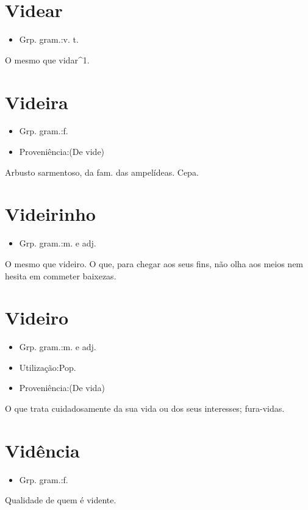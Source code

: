 \documentclass{article}
\begin{document}
\section{Videar}
\begin{itemize}
\item {Grp. gram.:v. t.}
\end{itemize}
O mesmo que \textunderscore vidar\textunderscore ^1.
\section{Videira}
\begin{itemize}
\item {Grp. gram.:f.}
\end{itemize}
\begin{itemize}
\item {Proveniência:(De \textunderscore vide\textunderscore )}
\end{itemize}
Arbusto sarmentoso, da fam. das ampelídeas.
Cepa.
\section{Videirinho}
\begin{itemize}
\item {Grp. gram.:m.  e  adj.}
\end{itemize}
O mesmo que \textunderscore videiro\textunderscore .
O que, para chegar aos seus fins, não olha aos meios nem hesita em commeter baixezas.
\section{Videiro}
\begin{itemize}
\item {Grp. gram.:m.  e  adj.}
\end{itemize}
\begin{itemize}
\item {Utilização:Pop.}
\end{itemize}
\begin{itemize}
\item {Proveniência:(De \textunderscore vida\textunderscore )}
\end{itemize}
O que trata cuidadosamente da sua vida ou dos seus interesses; fura-vidas.
\section{Vidência}
\begin{itemize}
\item {Grp. gram.:f.}
\end{itemize}
Qualidade de quem é vidente.
\end{document}
